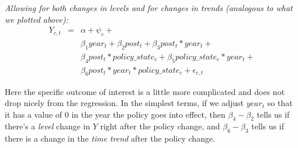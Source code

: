 \documentclass[12pt]{article}
\begin{document}
\emph{Allowing for both changes in levels and for changes in trends (analogous to what we plotted above):}
\begin{eqnarray}
 Y_{c,t} &=& \alpha + \psi_{c} + \label{diff_in_diff_wtime}\\
 && \beta_1 year_{t} + \beta_2 post_{t} + \beta_3 post_{t} * year_{t} + \nonumber \\
 && \beta_4 post_{t} * policy\_state_{c} +\beta_5 policy\_state_{c} * year_t + \nonumber \\
 && \beta_6 post_{t} * year_{t} * policy\_state_{c} + \epsilon_{c,t} \nonumber
\end{eqnarray}

 Here the specific outcome of interest is a little more complicated and does not drop nicely from the regression. In the simplest terms, if we adjust $year_{t}$ so that it has a value of 0 in the year the policy goes into effect, then $\beta_4-\beta_2$ tells us if there's a \emph{level} change in $Y$ right after the policy change, and $\beta_6 - \beta_3$ tells us if there is a change in the \emph{time trend} after the policy change.
\end{document}

